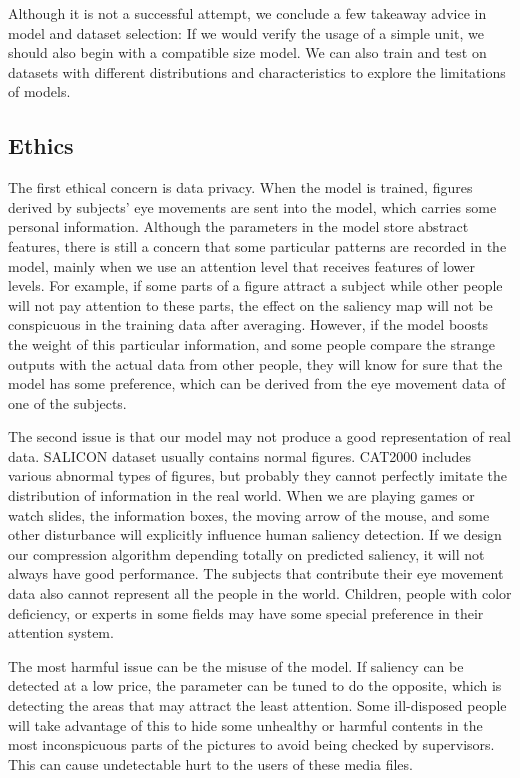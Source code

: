 \documentclass[12pt]{article}
\begin{document}
Although it is not a successful attempt, we conclude a few takeaway advice in model and dataset selection:
If we would verify the usage of a simple unit, we should also begin with a compatible size model.
We can also train and test on datasets with different distributions and characteristics to explore the limitations of models.

\subsection{Ethics}
The first ethical concern is data privacy. 
When the model is trained, figures derived by subjects’ eye movements are sent into the model, 
which carries some personal information. 
Although the parameters in the model store abstract features, 
there is still a concern that some particular patterns are recorded in the model,
mainly when we use an attention level that receives features of lower levels.
For example, if some parts of a figure attract a subject while other people will not pay attention to these parts,
the effect on the saliency map will not be conspicuous in the training data after averaging.
However, if the model boosts the weight of this particular information,
and some people compare the strange outputs with the actual data from other people,
they will know for sure that the model has some preference,
which can be derived from the eye movement data of one of the subjects.

The second issue is that our model may not produce a good representation of real data. 
SALICON dataset usually contains normal figures.
CAT2000 includes various abnormal types of figures, but probably they cannot perfectly imitate the distribution of information in the real world.
When we are playing games or watch slides, the information boxes,
the moving arrow of the mouse, and some other disturbance will explicitly influence human saliency detection.
If we design our compression algorithm depending totally on predicted saliency,
it will not always have good performance.
The subjects that contribute their eye movement data also cannot represent all the people in the world.
Children, people with color deficiency, or experts in some fields may have some special preference in their attention system.

The most harmful issue can be the misuse of the model. 
If saliency can be detected at a low price, the parameter can be tuned to do the opposite, 
which is detecting the areas that may attract the least attention. 
Some ill-disposed people will take advantage of this to hide some unhealthy or harmful contents in the most inconspicuous parts of the pictures to avoid being checked by supervisors. 
This can cause undetectable hurt to the users of these media files.
\end{document}
